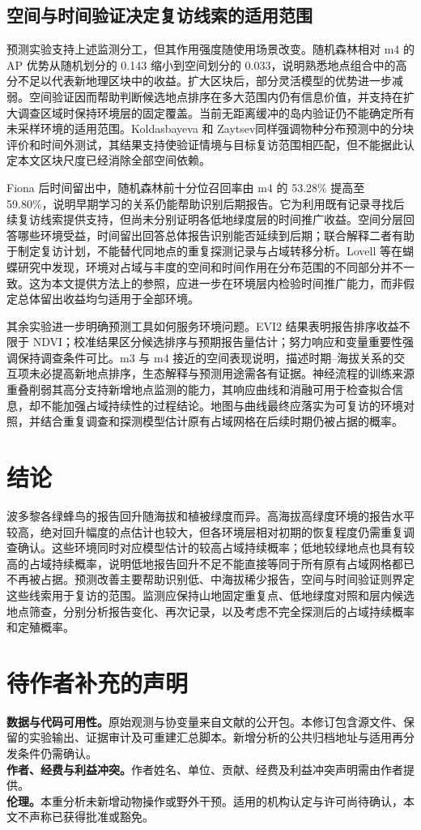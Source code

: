 \subsection{空间与时间验证决定复访线索的适用范围}
预测实验支持上述监测分工，但其作用强度随使用场景改变。随机森林相对 m4 的 AP 优势从随机划分的 0.143 缩小到空间划分的 0.033，说明熟悉地点组合中的高分不足以代表新地理区块中的收益。扩大区块后，部分灵活模型的优势进一步减弱。空间验证因而帮助判断候选地点排序在多大范围内仍有信息价值，并支持在扩大调查区域时保持环境层的固定覆盖\cite{roberts2017,valavi2019,ploton2020}。当前无距离缓冲的岛内验证仍不能确定所有未采样环境的适用范围。Koldasbayeva 和 Zaytsev\cite{spacetime2025}同样强调物种分布预测中的分块评价和时间外测试，其结果支持使验证情境与目标复访范围相匹配，但不能据此认定本文区块尺度已经消除全部空间依赖。

Fiona 后时间留出中，随机森林前十分位召回率由 m4 的 53.28\% 提高至 59.80\%，说明早期学习的关系仍能帮助识别后期报告。它为利用既有记录寻找后续复访线索提供支持，但尚未分别证明各低地绿度层的时间推广收益。空间分层回答哪些环境受益，时间留出回答总体报告识别能否延续到后期；联合解释二者有助于制定复访计划，不能替代同地点的重复探测记录与占域转移分析。Lovell 等\cite{lovell2025}在蝴蝶研究中发现，环境对占域与丰度的空间和时间作用在分布范围的不同部分并不一致。这为本文提供方法上的参照，应进一步在环境层内检验时间推广能力，而非假定总体留出收益均匀适用于全部环境。

其余实验进一步明确预测工具如何服务环境问题。EVI2 结果表明报告排序收益不限于 NDVI；校准结果区分候选排序与预期报告量估计；努力响应和变量重要性强调保持调查条件可比。m3 与 m4 接近的空间表现说明，描述时期--海拔关系的交互项未必提高新地点排序，生态解释与预测用途需各有证据\cite{elith2009}。神经流程的训练来源重叠削弱其高分支持新增地点监测的能力，其响应曲线和消融可用于检查拟合信息，却不能加强占域持续性的过程结论。地图与曲线最终应落实为可复访的环境对照，并结合重复调查和探测模型估计原有占域网格在后续时期仍被占据的概率。

\section{结论}
波多黎各绿蜂鸟的报告回升随海拔和植被绿度而异。高海拔高绿度环境的报告水平较高，绝对回升幅度的点估计也较大，但各环境层相对初期的恢复程度仍需重复调查确认。这些环境同时对应模型估计的较高占域持续概率；低地较绿地点也具有较高的占域持续概率，说明低地报告回升不足不能直接等同于所有原有占域网格都已不再被占据。预测改善主要帮助识别低、中海拔稀少报告，空间与时间验证则界定这些线索用于复访的范围。监测应保持山地固定重复点、低地绿度对照和层内候选地点筛查，分别分析报告变化、再次记录，以及考虑不完全探测后的占域持续概率和定殖概率。

\section*{待作者补充的声明}
\textbf{数据与代码可用性。}原始观测与协变量来自文献\cite{ortiz2026}的公开包。本修订包含源文件、保留的实验输出、证据审计及可重建汇总脚本。新增分析的公共归档地址与适用再分发条件仍需确认。\\
\textbf{作者、经费与利益冲突。}作者姓名、单位、贡献、经费及利益冲突声明需由作者提供。\\
\textbf{伦理。}本重分析未新增动物操作或野外干预。适用的机构认定与许可尚待确认，本文不声称已获得批准或豁免。\\
\FloatBarrier
